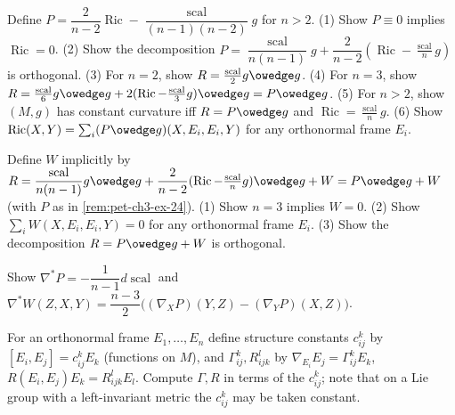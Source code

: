 \begin{remark}
  \label{rem:pet-ch3-ex-24}
  \leanok
  Define $P=\dfrac2{n-2}\operatorname{Ric}-\dfrac{\operatorname{scal}}{(n-1)(n-2)}g$
  for $n>2$. (1) Show $P\equiv0$ implies $\operatorname{Ric}=0$. (2) Show the
  decomposition
  $P=\dfrac{\operatorname{scal}}{n(n-1)}g+\dfrac2{n-2}(\operatorname{Ric}-\tfrac{\operatorname{scal}}ng)$
  is orthogonal. (3) For $n=2$, show $R=\tfrac{\operatorname{scal}}2g\owedge g$.
  (4) For $n=3$, show
  $R=\tfrac{\operatorname{scal}}6g\owedge g+2(\operatorname{Ric}-\tfrac{\operatorname{scal}}3g)\owedge
  g=P\owedge g$. (5) For $n>2$, show $(M,g)$ has constant curvature iff
  $R=P\owedge g$ and $\operatorname{Ric}=\tfrac{\operatorname{scal}}ng$. (6) Show
  $\operatorname{Ric}(X,Y)=\sum_i(P\owedge g)(X,E_i,E_i,Y)$ for any orthonormal
  frame $E_i$.
\end{remark}

\begin{remark}
  \label{rem:pet-ch3-ex-25}
  \leanok
  Define $W$ implicitly by
  $R=\dfrac{\operatorname{scal}}{n(n-1)}g\owedge g+\dfrac2{n-2}(\operatorname{Ric}-\tfrac{\operatorname{scal}}ng)\owedge
  g+W=P\owedge g+W$ (with $P$ as in \cref{rem:pet-ch3-ex-24}). (1) Show $n=3$
  implies $W=0$. (2) Show $\sum_iW(X,E_i,E_i,Y)=0$ for any orthonormal frame
  $E_i$. (3) Show the decomposition $R=P\owedge g+W$ is orthogonal.
\end{remark}

\begin{remark}[Exercise 3.4.26]
  \label{rem:pet-ch3-ex-26}
  \leanok
  Show $\nabla^*P=-\dfrac1{n-1}d\operatorname{scal}$ and
  $\nabla^*W(Z,X,Y)=\dfrac{n-3}2\big((\nabla_XP)(Y,Z)-(\nabla_YP)(X,Z)\big)$.
\end{remark}

\begin{remark}
  \label{rem:pet-ch3-ex-27}
  \leanok
  For an orthonormal frame $E_1,\dots,E_n$ define structure constants $c^k_{ij}$
  by $[E_i,E_j]=c^k_{ij}E_k$ (functions on $M$), and $\Gamma^k_{ij},R^l_{ijk}$ by
  $\nabla_{E_i}E_j=\Gamma^k_{ij}E_k$, $R(E_i,E_j)E_k=R^l_{ijk}E_l$. Compute
  $\Gamma,R$ in terms of the $c^k_{ij}$; note that on a Lie group with a
  left-invariant metric the $c^k_{ij}$ may be taken constant.
\end{remark}

